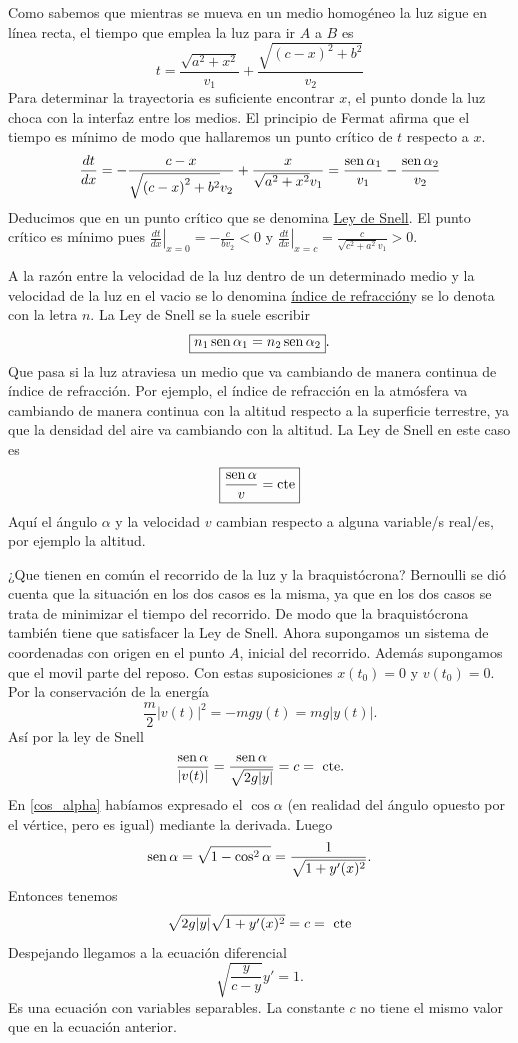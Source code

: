 Como sabemos que mientras se mueva en un medio homogéneo la luz sigue en línea recta,
el tiempo que emplea la luz para ir $A$ a $B$ es
 \[t=\frac{\sqrt{a^{2} + x^{2}}}{v_{1}} + \frac{\sqrt{{\left(c - x\right)}^{2} + b^{2}}}{v_{2}}\]
Para determinar la trayectoria es suficiente encontrar $x$, el punto donde la luz choca con la interfaz entre los medios. 
El principio de Fermat afirma que el tiempo es mínimo de modo que hallaremos un punto crítico de $t$ respecto a $x$. 
\[ \frac{dt}{dx}=-\frac{c - x}{\sqrt{{\left(c - x\right)}^{2} + b^{2}} v_{2}} +
\frac{x}{\sqrt{a^{2} + x^{2}} v_{1}}=\frac{\sen\alpha_1}{v_1}-\frac{\sen\alpha_2}{v_2} \]
Deducimos que en un punto crítico 
que se denomina \href{http://es.wikipedia.org/wiki/Ley_de_Snell}{Ley de Snell}\link. El punto crítico es mínimo pues $\left.\frac{dt}{dx}\right|_{x=0}=-\tfrac{c}{bv_2}<0$ y
$\left.\frac{dt}{dx}\right|_{x=c}=\tfrac{c}{\sqrt{c^2+a^2}v_1}>0$.

 A la razón entre la velocidad de la luz dentro de un determinado medio y la velocidad de la luz en el vacio se lo denomina
\href{http://es.wikipedia.org/wiki/Índice_de_refracción}{índice de refracción}\link y se lo denota con la letra $n$. La Ley de Snell se la suele escribir
\[\boxed{n_1\sen\alpha_1=n_2\sen\alpha_2 }.\]
Que pasa si la luz atraviesa un medio que va cambiando de manera continua de índice de refracción. Por ejemplo, el índice de refracción en la atmósfera
va cambiando de manera continua con la altitud respecto a la superficie terrestre, ya que la densidad del aire va cambiando con la altitud. La Ley de
Snell en este caso es
\[\boxed{\frac{\sen\alpha}{v}=\text{cte}}\]
Aquí el ángulo $\alpha$ y la velocidad $v$ cambian respecto a alguna variable/s real/es, por ejemplo la altitud.


¿Que tienen en común el recorrido de la luz y la braquistócrona? Bernoulli se dió cuenta que la situación en los dos casos es la misma, ya que en los dos casos
se trata de minimizar el tiempo del recorrido. De modo que la braquistócrona también tiene que satisfacer la Ley de Snell.
 Ahora supongamos un sistema de coordenadas con origen en el punto $A$, inicial del recorrido.  Además supongamos que el movil  parte
del reposo. Con estas suposiciones $x(t_0)=0$ y $v(t_0)=0$. Por la conservación de la energía 
\[\frac{m}{2}|v(t)|^2=-mgy(t)=mg|y(t)|.\]
 Así por la ley de Snell
\[\frac{\sen\alpha}{|v(t)|}=\frac{\sen\alpha}{\sqrt{2g|y|}}=c=\text{ cte}.\]
En \eqref{cos_alpha} habíamos expresado el $\cos\alpha$ (en realidad del ángulo opuesto por el vértice, pero es igual) mediante la derivada. Luego
\[\sen\alpha=\sqrt{1-\cos^2\alpha}=\frac{1}{\sqrt{1+y'(x)^2}}.\]
Entonces tenemos
\[\sqrt{2g|y|}\sqrt{1+y'(x)^2}=c=\hbox{ cte}\]
Despejando llegamos a la ecuación diferencial
\[\boxed{\sqrt{\frac{y}{c-y}}y'=1}.\]
Es una ecuación con variables separables. La constante $c$ no tiene el mismo valor que en la ecuación anterior.  

